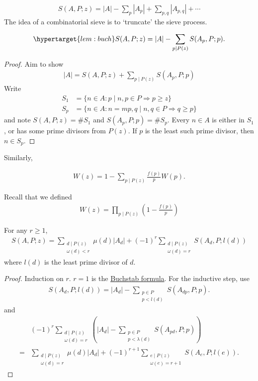 \documentclass{article}
\begin{document}
\begin{align*}
  S(A,P;z) = |A| - \sum_p |A_p| + \sum_{p,q} |A_{p,q}| + \dotsb
\end{align*}
The idea of a combinatorial sieve is to `truncate' the sieve process.
\begin{lemma}
  \begin{equation*}
    \hypertarget{lem:buch} S(A,P;z) = |A| - \sum_{p \mid P(z)} S(A_p, P; p).
  \end{equation*}
\end{lemma}
\begin{proof}
  Aim to show
  \begin{align*}
    |A| = S(A,P;z) + \sum_{p \mid P(z)} S(A_p, P; p)
  \end{align*}
  Write
  \begin{align*}
    S_1 &= \{n \in A : p \mid n, p \in P \Rightarrow p \geq z\} \\
    S_p &= \{n \in A : n = mp, q \mid n, q \in P \Rightarrow q \geq p\}
  \end{align*}
  and note $S(A,P;z) = \# S_1$ and $S(A_p, P; p) = \# S_p$. Every $n \in A$ is either in $S_1$, or has some prime divisors from $P(z)$. If $p$ is the least such prime divisor, then $n \in S_p$.
\end{proof}
Similarly,
\begin{lemma}
  \begin{align*}
    W(z) = 1 - \sum_{p \mid P(z)} \frac{f(p)}{p} W(p).
  \end{align*}
\end{lemma}
Recall that we defined
\begin{align*}
  W(z) = \prod_{p \mid P(z)} \left(1 - \frac{f(p)}{p}\right)
\end{align*}
\begin{cor}
  For any $r \geq 1$,
  \begin{align*}
    S(A,P;z) = \sum_{\substack{d \mid P(z) \\ \omega(d) < r}} \mu(d) |A_d| + (-1)^r \sum_{\substack{d \mid P(z) \\ \omega(d) = r}} S(A_d, P; l(d))
  \end{align*}
  where $l(d)$ is the least prime divisor of $d$.
\end{cor}
\begin{proof}
  Induction on $r$. $r=1$ is the \hyperlink{lem:buch}{Buchstab formula}. For the inductive step, use
  \begin{align*}
    S(A_d, P; l(d)) = |A_d| - \sum_{\substack{p \in P \\ p < l(d)}} S(A_{dp}, P; p).
  \end{align*}
  and
  \begin{align*}
    &(-1)^r \sum_{\substack{d \mid P(z) \\ \omega(d) = r}} \left(|A_d| - \sum_{\substack{p \in P \\ p < \lambda(d)}} S(A_{pd}, P; p)\right) \\
    = & \sum_{\substack{d \mid P(z) \\ \omega(d) = r}} \mu(d) |A_d| + (-1)^{r+1} \sum_{\substack{e \mid P(z) \\ \omega(e) = r+1}} S(A_e, P; l(e)).
  \end{align*}
\end{proof}
\end{document}
